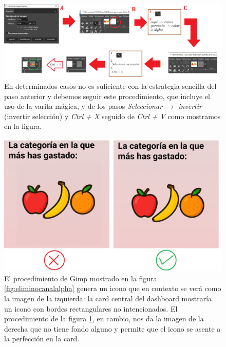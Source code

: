 \documentclass[a4paper,12pt]{report}
\begin{document}
\FloatBarrier
\setlength{\belowcaptionskip}{3pt}
\begin{figure}[H]
	\centering
	\caption{En determinados casos no es suficiente con la estrategia sencilla del paso anterior y debemos seguir este procedimiento, que incluye el uso de la varita mágica, y de los pasos \textit{Seleccionar} $\rightarrow$ \textit{invertir} (invertir selección) y \textit{Ctrl + X} seguido de \textit{Ctrl + V} como mostramos en la figura.} 
	\includegraphics[width=1\linewidth]{img/eliminoCanalAlphaCOMPLEX.png}

	
	\label{fig:eliminocanalalphaCOMPLEX}
\end{figure}
\FloatBarrier



\FloatBarrier
\setlength{\belowcaptionskip}{3pt}
\begin{figure}[H]
	\centering
	\caption{El procedimiento de Gimp mostrado en la figura \ref{fig:eliminocanalalpha} genera un icono que en contexto se verá como la imagen de la izquierda: la card central del dashboard mostraría un icono con bordes rectangulares no intencionados. El procedimiento de la figura \ref{fig:eliminocanalalphaCOMPLEX}, en cambio, nos da la imagen de la derecha que no tiene fondo alguno y permite que el icono se asente a la perfección en la card.}
	\includegraphics[width=1\linewidth]{img/ventatjaProcedComplexVSsimple.png}

	
	\label{fig:ventatjaProcedComplexVSsimple}
\end{figure}
\FloatBarrier
	
\end{document}

